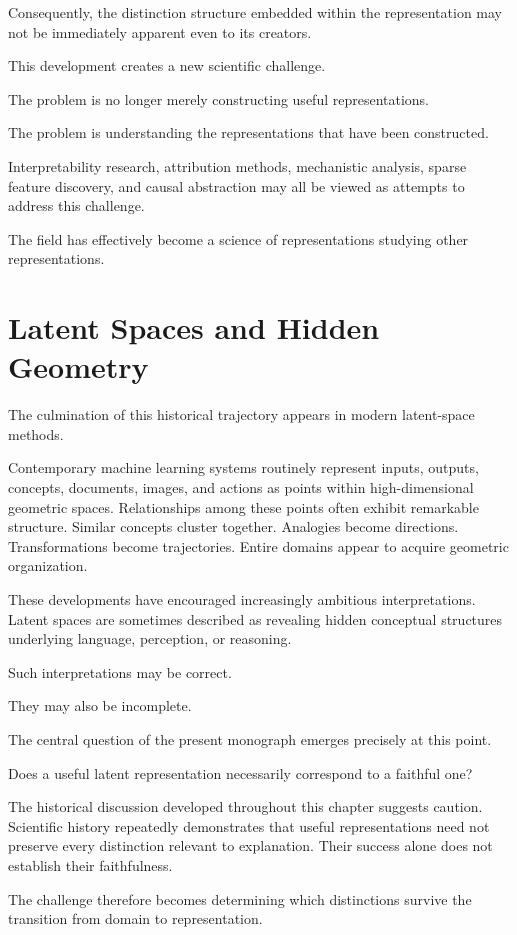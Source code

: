 \documentclass[11pt,oneside,openany]{book}
\begin{document}
Consequently, the distinction structure embedded within the representation may not be immediately apparent even to its creators.

This development creates a new scientific challenge.

The problem is no longer merely constructing useful representations.

The problem is understanding the representations that have been constructed.

Interpretability research, attribution methods, mechanistic analysis, sparse feature discovery, and causal abstraction may all be viewed as attempts to address this challenge.

The field has effectively become a science of representations studying other representations.

\section{Latent Spaces and Hidden Geometry}

The culmination of this historical trajectory appears in modern latent-space methods.

Contemporary machine learning systems routinely represent inputs, outputs, concepts, documents, images, and actions as points within high-dimensional geometric spaces. Relationships among these points often exhibit remarkable structure. Similar concepts cluster together. Analogies become directions. Transformations become trajectories. Entire domains appear to acquire geometric organization.

These developments have encouraged increasingly ambitious interpretations. Latent spaces are sometimes described as revealing hidden conceptual structures underlying language, perception, or reasoning.

Such interpretations may be correct.

They may also be incomplete.

The central question of the present monograph emerges precisely at this point.

Does a useful latent representation necessarily correspond to a faithful one?

The historical discussion developed throughout this chapter suggests caution. Scientific history repeatedly demonstrates that useful representations need not preserve every distinction relevant to explanation. Their success alone does not establish their faithfulness.

The challenge therefore becomes determining which distinctions survive the transition from domain to representation.
\end{document}
